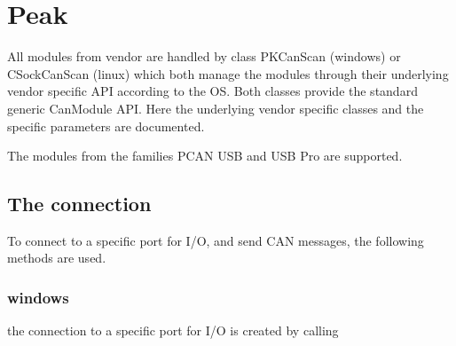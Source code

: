 \documentclass[letterpaper,10pt,english]{sphinxmanual}
\begin{document}
\chapter{Peak}
\label{\detokenize{vendors/peak:peak}}\label{\detokenize{vendors/peak::doc}}
All modules from vendor {\hyperref[\detokenize{vendors/peak:peak}]{}} are handled by class PKCanScan (windows) or CSockCanScan (linux) which
both manage the modules through their underlying vendor specific API according to the OS.
Both classes provide the standard generic CanModule API.
Here the underlying vendor specific classes and the specific parameters are documented.

The modules from the families PCAN USB and USB Pro are supported.


\section{The connection}
\label{\detokenize{vendors/peak:the-connection}}
To connect to a specific port for I/O, and send CAN messages, the following methods are used.


\subsection{windows}
\label{\detokenize{vendors/peak:windows}}
the connection to a specific port for I/O is created by calling
\end{document}
